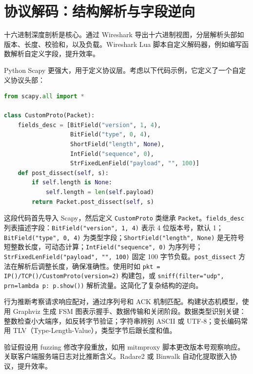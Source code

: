 \chapter{协议解码：结构解析与字段逆向}
十六进制深度剖析是核心。通过 Wireshark 导出十六进制视图，分层解析头部如版本、长度、校验和，以及负载。Wireshark Lua 脚本自定义解码器，例如编写函数解析自定义字段，提升效率。\par
Python Scapy 更强大，用于定义协议层。考虑以下代码示例，它定义了一个自定义协议头部：\par
\begin{lstlisting}[language=python]
from scapy.all import *

class CustomProto(Packet):
    fields_desc = [BitField("version", 1, 4),
                   BitField("type", 0, 4),
                   ShortField("length", None),
                   IntField("sequence", 0),
                   StrFixedLenField("payload", "", 100)]
    def post_dissect(self, s):
        if self.length is None:
            self.length = len(self.payload)
        return Packet.post_dissect(self, s)
\end{lstlisting}
这段代码首先导入 Scapy，然后定义 \texttt{CustomProto} 类继承 \texttt{Packet}。\texttt{fields\_{}desc} 列表描述字段：\texttt{BitField("version", 1, 4)} 表示 4 位版本号，默认 1；\texttt{BitField("type", 0, 4)} 为类型字段；\texttt{ShortField("length", None)} 是无符号短整数长度，可动态计算；\texttt{IntField("sequence", 0)} 为序列号；\texttt{StrFixedLenField("payload", "", 100)} 固定 100 字节负载。\texttt{post\_{}dissect} 方法在解析后调整长度，确保准确性。使用时如 \texttt{pkt = IP()/TCP()/CustomProto(version=2)} 构建包，或 \texttt{sniff(filter="udp", prn=lambda p: p.show())} 解析流量。这简化了复杂结构的逆向。\par
行为推断考察请求响应配对，通过序列号和 ACK 机制匹配。构建状态机模型，使用 Graphviz 生成 FSM 图表示握手、数据传输和关闭阶段。数据类型识别关键：整数检查小大端序，如反转字节验证；字符串辨别 ASCII 或 UTF-8；变长编码常用 TLV（Type-Length-Value），类型字节后跟长度和值。\par
验证假设用 fuzzing 修改字段重放，如用 mitmproxy 脚本更改版本号观察响应。关联客户端服务端日志对比推断含义。Radare2 或 Binwalk 自动化提取嵌入协议，提升效率。\par
